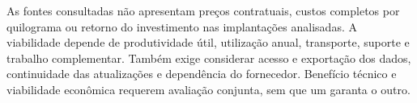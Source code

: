 As fontes consultadas não apresentam preços contratuais, custos completos por quilograma ou retorno do investimento nas implantações analisadas. A viabilidade depende de produtividade útil, utilização anual, transporte, suporte e trabalho complementar. Também exige considerar acesso e exportação dos dados, continuidade das atualizações e dependência do fornecedor. Benefício técnico e viabilidade econômica requerem avaliação conjunta, sem que um garanta o outro.
